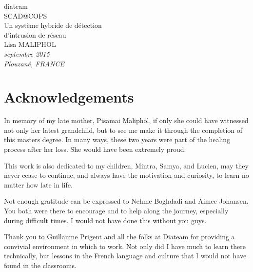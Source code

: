 \documentclass[11pt,]{article}
\begin{document}
\begin{center}

\vspace{30mm}

{\Huge diateam}\\
\bigskip
{\Huge SCAD@COPS}\\
\bigskip
\bigskip
{\Huge Un système hybride de détection}\\
{\Huge d’intrusion de réseau }\\

\vspace{30mm}
{\huge Lisa MALIPHOL}\\

\vspace{75mm}
\textit{septembre 2015}\\
\medskip
\textit{Plouzané, FRANCE}\\

\end{center}

\thispagestyle{empty} \newpage
\mbox{} \thispagestyle{empty}

\newpage

\section*{Acknowledgements}\label{acknowledgements}

In memory of my late mother, Pisamai Maliphol, if only she could have
witnessed not only her latest grandchild, but to see me make it through
the completion of this masters degree. In many ways, these two years
were part of the healing process after her loss. She would have been
extremely proud.

This work is also dedicated to my children, Mintra, Samya, and Lucien,
may they never cease to continue, and always have the motivation and
curiosity, to learn no matter how late in life.

Not enough gratitude can be expressed to Nehme Boghdadi and Aimee
Johansen. You both were there to encourage and to help along the
journey, especially during difficult times. I would not have done this
without you guys.

Thank you to Guillaume Prigent and all the folks at Diateam for
providing a convivial environment in which to work. Not only did I have
much to learn there technically, but lessons in the French language and
culture that I would not have found in the classrooms.
\end{document}
